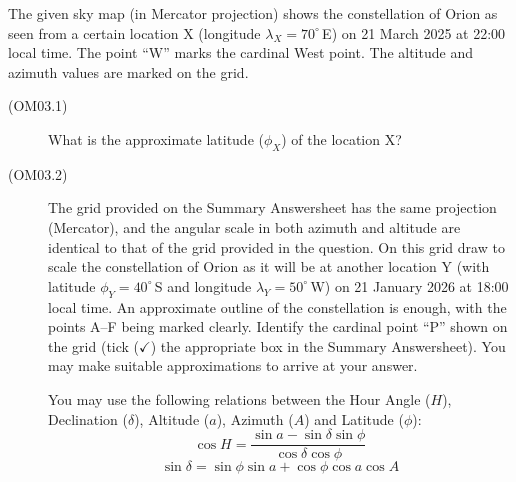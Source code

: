The given sky map (in Mercator projection) shows the constellation of Orion as
seen from a certain location X (longitude $\lambda_X = 70^\circ$\,E) on
21 March 2025 at 22:00 local time. The point ``W'' marks the cardinal West
point. The altitude and azimuth values are marked on the grid.


\begin{description}
\item[(OM03.1)] What is the approximate latitude ($\phi_X$) of the
  location X?
\item[(OM03.2)] The grid provided on the Summary Answersheet has the same
  projection (Mercator), and the angular scale in both azimuth and altitude
  are identical to that of the grid provided in the question. On this grid
  draw to scale the constellation of Orion as it will be at another location Y
  (with latitude $\phi_Y = 40^\circ$\,S and longitude
  $\lambda_Y = 50^\circ$\,W) on 21 January 2026 at 18:00 local time. An
  approximate outline of the constellation is enough, with the points A--F
  being marked clearly. Identify the cardinal point ``P'' shown on the grid
  (tick ($\checkmark$) the appropriate box in the Summary Answersheet). You
  may make suitable approximations to arrive at your answer.

  You may use the following relations between the Hour Angle ($H$),
  Declination ($\delta$), Altitude ($a$), Azimuth ($A$) and Latitude
  ($\phi$):
  \[ \cos H = \frac{\sin a - \sin\delta \sin\phi}{\cos\delta \cos\phi} \]
  \[ \sin\delta = \sin\phi \sin a + \cos\phi \cos a \cos A \]
\end{description}
